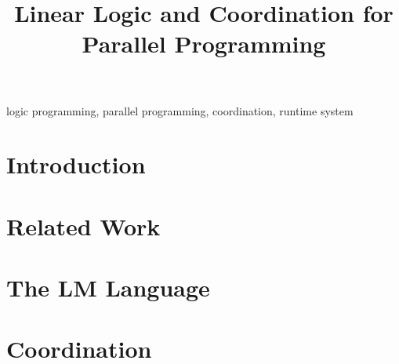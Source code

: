 \documentclass{sigplanconf}[9pt]
\begin{document}
\setlength{\pdfpageheight}{\paperheight}
\setlength{\pdfpagewidth}{\paperwidth}






\title{Linear Logic and Coordination for Parallel Programming}


\newcommand{\lang}{LM }

\begin{abstract}

\end{abstract}


\keywords
logic programming, parallel programming, coordination, runtime system

\section{Introduction}


\section{Related Work}


\section{The \lang Language}


\section{Coordination}

\end{document}
